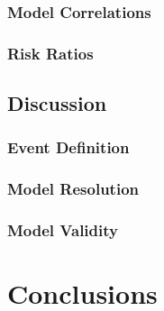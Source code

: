 \documentclass[12pt,a4paper]{report}
\begin{document}

\subsection{Model Correlations}\label{subsec:modelcorr}


\subsection{Risk Ratios}\label{subsec:riskratio}



\section{Discussion}\label{sec:discussion}

\subsection{Event Definition}\label{subsec:diseventdef}



\subsection{Model Resolution}\label{subsec:dismodeldef}

\subsection{Model Validity}\label{subsec:dismodelvalid}

\chapter{Conclusions}\label{ch:conclusions}
\end{document}
